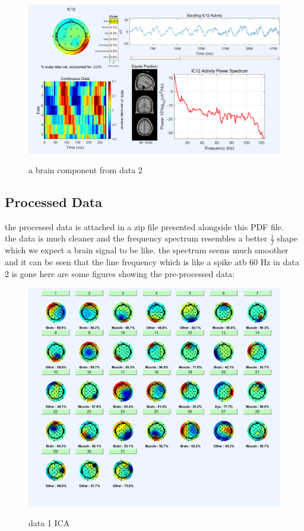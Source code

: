 \documentclass[11pt]{article}
\begin{document}
\begin{figure}[H]
    \begin{center}
        \includegraphics[scale=0.6]{Fig/brain_IC12_data2.png}
        \label{fig:brain2}
        \caption{a brain component from data 2}
    \end{center}
\end{figure}

\subsection{Processed Data}
the processed data is attached in a zip file presented alongside this PDF file. \\
the data is much cleaner and the frequency spectrum resembles a better $\frac{1}{f}$ shape
which we expect a brain signal to be like. the spectrum seems much smoother and it can
be seen that the line frequency which is like a spike atb 60 Hz in data 2 is gone
here are some figures showing the pre-processed data: \\
\begin{figure}[H]
    \begin{center}
        \includegraphics[scale=0.55]{Fig/ICA_sources_data1.png}
        \label{fig:ICAsources1}
        \caption{data 1 ICA}
    \end{center}
\end{figure}
\end{document}
